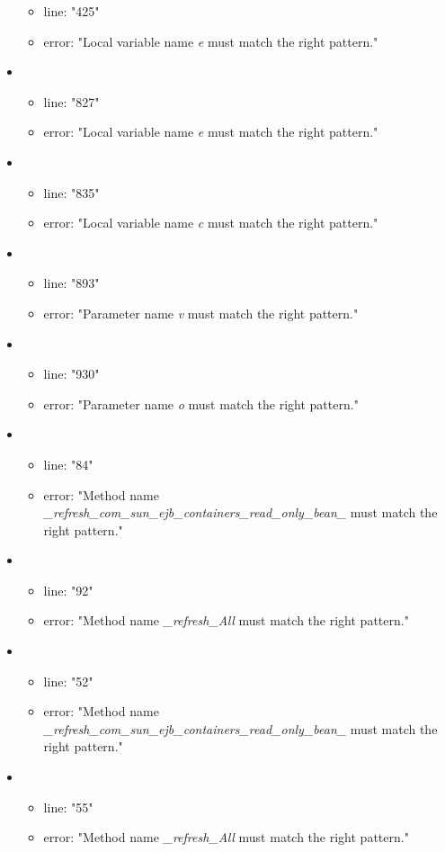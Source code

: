 \begin{itemize}
	\begin{itemize} 
		\item line: "425" 
		\item error: "Local variable name \emph{e} must match the right pattern." 
	\end{itemize}
	\item 
	\begin{itemize} 
		\item line: "827" 
		\item error: "Local variable name \emph{e} must match the right pattern." 
	\end{itemize}
	\item 
	\begin{itemize} 
		\item line: "835" 
		\item error: "Local variable name \emph{c} must match the right pattern." 
	\end{itemize}
	\item 
	\begin{itemize} 
		\item line: "893" 
		\item error: "Parameter name \emph{v} must match the right pattern." 
	\end{itemize}
	\item 
	\begin{itemize} 
		\item line: "930" 
		\item error: "Parameter name \emph{o} must match the right pattern." 
	\end{itemize}
	\item 
	\begin{itemize} 
		\item line: "84" 
		\item error: "Method name \emph{\_refresh\_com\_sun\_ejb\_containers\_read\_only\_bean\_} must match the right pattern." 
	\end{itemize}
	\item 
	\begin{itemize} 
		\item line: "92" 
		\item error: "Method name \emph{\_refresh\_All} must match the right pattern." 
	\end{itemize}
	\item 
	\begin{itemize} 
		\item line: "52" 
		\item error: "Method name \emph{\_refresh\_com\_sun\_ejb\_containers\_read\_only\_bean\_} must match the right pattern." 
	\end{itemize}
	\item 
	\begin{itemize} 
		\item line: "55" 
		\item error: "Method name \emph{\_refresh\_All} must match the right pattern." 


	\end{itemize}
\end{itemize}
